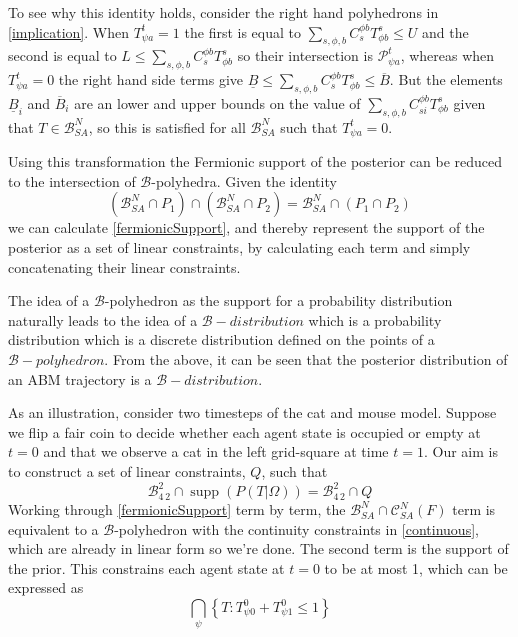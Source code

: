 \documentclass{article}
\DeclareMathOperator\supp{supp}
\begin{document}
To see why this identity holds, consider the right hand polyhedrons in \eqref{implication}. When $T^t_{\psi a}=1$ the first is equal to $\sum_{s,\phi,b} C^{\phi b}_{s} T^s_{\phi b} \le U$ and the second is equal to $L \le \sum_{s,\phi,b} C^{\phi b}_{s} T^s_{\phi b}$ so their intersection is $\mathcal{P}^t_{\psi a}$, whereas when $T^t_{\psi a}=0$ the right hand side terms give $\underline{B} \le \sum_{s,\phi,b} C^{\phi b}_{s} T^s_{\phi b} \le \overline{B}$. But the elements $\underline{B}_i$ and $\overline{B}_i$ are an lower and upper bounds on the value of $\sum_{s,\phi,b} C^{\phi b}_{si} T^s_{\phi b}$ given that $T\in\mathcal{B}^N_{SA}$, so this is satisfied for all $\mathcal{B}^N_{SA}$ such that $T^t_{\psi a}=0$.

Using this transformation the Fermionic support of the posterior can be reduced to the intersection of $\mathcal{B}$-polyhedra. Given the identity
\[
(\mathcal{B}^N_{SA} \cap P_1) \cap (\mathcal{B}^N_{SA} \cap P_2) = \mathcal{B}^N_{SA} \cap (P_1 \cap P_2)
\]
we can calculate \eqref{fermionicSupport}, and thereby represent the support of the posterior as a set of linear constraints, by calculating each term and simply concatenating their linear constraints.

The idea of a $\mathcal{B}$-polyhedron as the support for a probability distribution naturally leads to the idea of a $\mathcal{B}-distribution$ which is a probability distribution which is a discrete distribution defined on the points of a $\mathcal{B}-polyhedron$. From the above, it can be seen that the posterior distribution of an ABM trajectory is a $\mathcal{B}-distribution$.

As an illustration, consider two timesteps of the cat and mouse model. Suppose we flip a fair coin to decide whether each agent state is occupied or empty at $t=0$ and that we observe a cat in the left grid-square at time $t=1$. Our aim is to construct a set of linear constraints, $Q$, such that
\[
\mathcal{B}^2_{4\,2} \cap \supp(P(T|\Omega)) = \mathcal{B}^2_{4\,2} \cap Q
\]
Working through \eqref{fermionicSupport} term by term, the $\mathcal{B}^N_{SA} \cap \mathcal{C}^N_{SA}(F)$ term is equivalent to a $\mathcal{B}$-polyhedron with the continuity constraints in \eqref{continuous}, which are already in linear form so we're done. The second term is the support of the prior. This constrains each agent state at $t=0$ to be at most 1, which can be expressed as
\[
\bigcap_\psi \left\{T:T^0_{\psi 0} + T^0_{\psi 1} \le 1\right\}
\]
\end{document}
